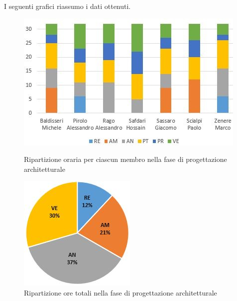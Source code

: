 I seguenti grafici riassumo i dati ottenuti.

\begin{figure}[!htb]
   \begin{minipage}{0.6\textwidth}
     \centering
     \includegraphics{Images/PO-Progettazione}
     \caption{Ripartizione oraria per ciascun membro nella fase di progettazione architetturale}
   \end{minipage}\hspace{0.1\textwidth}
   \begin{minipage}{0.3\textwidth}
     \centering
     \includegraphics[width=.9\textwidth]{Images/PE-Analisi}
     \captionsetup{width=1.1\textwidth}
     \caption{Ripartizione ore totali nella fase di progettazione architetturale}
   \end{minipage}
\end{figure}